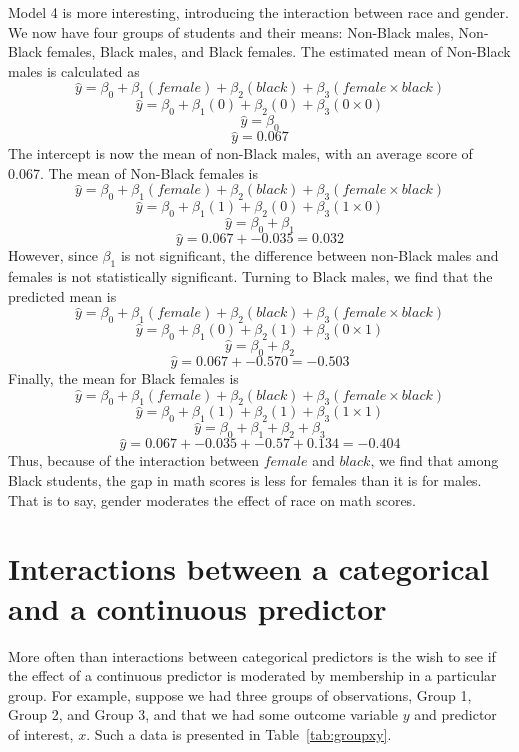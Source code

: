 Model 4 is more interesting, introducing the interaction between race and gender. We now have four groups of students and their means: Non-Black males, Non-Black females, Black males, and Black females.  The estimated mean of Non-Black males is calculated as
\[
\hat{y}=\beta_0+\beta_1\left(female\right)+\beta_2\left(black\right)+\beta_3\left(female \times black\right)
\]
\[
\hat{y}=\beta_0+\beta_1\left(0\right)+\beta_2\left(0\right)+\beta_3\left(0 \times 0\right)
\]
\[
\hat{y}=\beta_0
\]
\[
\hat{y}=0.067
\]
The intercept is now the mean of non-Black males, with an average score of 0.067. The mean of Non-Black females is
\[
\hat{y}=\beta_0+\beta_1\left(female\right)+\beta_2\left(black\right)+\beta_3\left(female \times black\right)
\]
\[
\hat{y}=\beta_0+\beta_1\left(1\right)+\beta_2\left(0\right)+\beta_3\left(1 \times 0\right)
\]
\[
\hat{y}=\beta_0+\beta_1
\]
\[
\hat{y}=0.067+-0.035=0.032
\]
However, since $\beta_1$ is not significant, the difference between non-Black males and females is not statistically significant. Turning to Black males, we find that the predicted mean is
\[
\hat{y}=\beta_0+\beta_1\left(female\right)+\beta_2\left(black\right)+\beta_3\left(female \times black\right)
\]
\[
\hat{y}=\beta_0+\beta_1\left(0\right)+\beta_2\left(1\right)+\beta_3\left(0 \times 1\right)
\]
\[
\hat{y}=\beta_0+\beta_2
\]
\[
\hat{y}=0.067+-0.570=-0.503
\]
Finally, the mean for Black females is
\[
\hat{y}=\beta_0+\beta_1\left(female\right)+\beta_2\left(black\right)+\beta_3\left(female \times black\right)
\]
\[
\hat{y}=\beta_0+\beta_1\left(1\right)+\beta_2\left(1\right)+\beta_3\left(1 \times 1\right)
\]
\[
\hat{y}=\beta_0+\beta_1+\beta_2+\beta_3
\]
\[
\hat{y}=0.067+-0.035+-0.57+0.134=-0.404
\]
Thus, because of the interaction between $female$ and $black$, we find that among Black students, the gap in math scores is less for females than it is for males. That is to say, gender moderates the effect of race on math scores.

\section{Interactions between a categorical and a continuous predictor}

More often than interactions between categorical predictors is the wish to see if the effect of a continuous predictor is moderated by membership in a particular group. For example, suppose we had three groups of observations, Group 1, Group 2, and Group 3, and that we had some outcome variable $y$ and predictor of interest, $x$. Such a data is presented in Table~\ref{tab:groupxy}.


